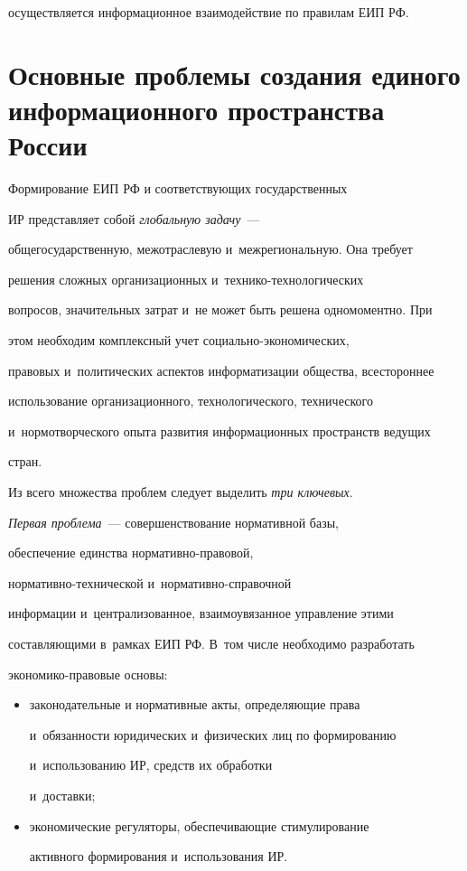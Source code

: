 осуществляется информационное взаимодействие по правилам ЕИП РФ.



     \section{Основные проблемы создания единого информационного пространства России}



     Формирование ЕИП РФ и соответствующих государственных

ИР представляет собой \textit{глобальную задачу}~---

общегосударственную, межотраслевую и~межрегиональную. Она требует

решения сложных организационных и~тех\-ни\-ко-тех\-но\-ло\-ги\-че\-ских

вопросов, значительных затрат и~не может быть решена одномоментно. При

этом необходим комплексный учет со\-ци\-аль\-но-эко\-но\-ми\-че\-ских,

правовых и~политических аспектов информатизации общества, всестороннее

использование организационного, технологического, технического

и~нормотворческого опыта развития информационных пространств ведущих

стран.



     Из всего множества проблем следует выделить \textit{три ключевых}.



     \textit{Первая проблема}~--- совершенствование нормативной базы,

обеспечение единства нор\-ма\-тив\-но-пра\-во\-вой,

     нор\-ма\-тив\-но-тех\-ни\-че\-ской и~нор\-ма\-тив\-но-спра\-воч\-ной

информации и~централизованное, взаимоувязанное управление этими

составляющими в~рамках ЕИП РФ. В~том числе необходимо разработать

     эко\-но\-ми\-ко-пра\-во\-вые основы:

     \begin{itemize}

     \item законодательные и нормативные акты, определяющие права

и~обязанности юридических и~физических лиц по формированию

и~использованию ИР, средств их обработки

и~доставки;

     \item экономические регуляторы, обеспечивающие стимулирование

активного формирования и~использования ИР.

     \end{itemize}



